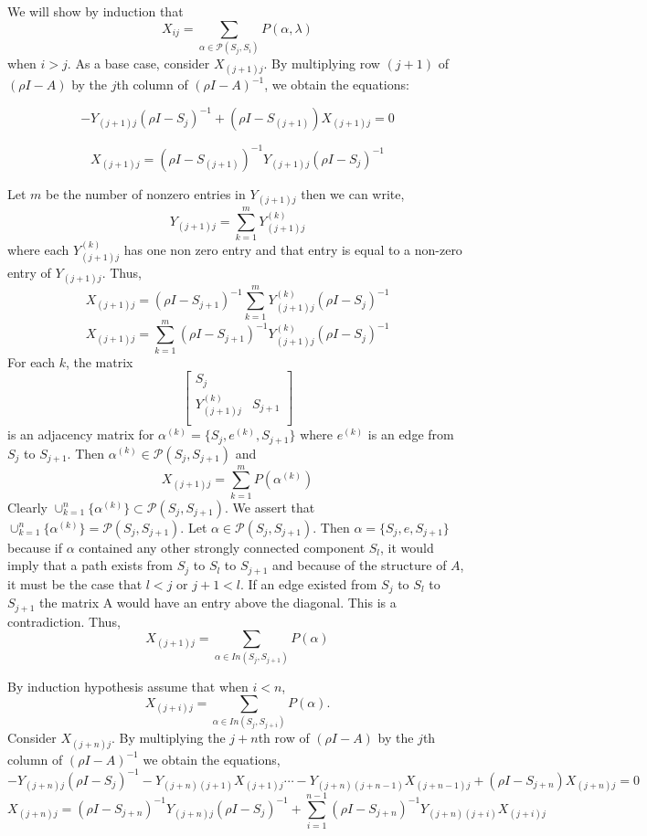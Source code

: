 \documentclass{paper}
\begin{document}
We will show by induction that 
\[
X_{ij} = \sum_{\alpha \in \mathcal{P}(S_j,S_i)} P(\alpha,\lambda)
\]
when $i > j$. As a base case, consider $X_{(j+1)j}$. By multiplying row $(j+1)$ of $(\rho I-A)$ by the $j$th column of $(\rho I - A)^{-1}$, we obtain the equations:

\[
-Y_{(j+1)j}(\rho I - S_{j})^{-1} + (\rho I -S_{(j+1)})X_{(j+1)j} = 0
\]

\begin{equation}
X_{(j+1)j} = (\rho I - S_{(j+1)})^{-1}Y_{(j+1)j}(\rho I - S_j)^{-1}
\end{equation}

Let $m$ be the number of nonzero entries in $Y_{(j+1)j}$ then we can write, 
\[Y_{(j+1)j} = \sum_{k=1}^{m} Y_{(j+1)j}^{(k)}\] 
where each $Y_{(j+1)j}^{(k)}$ has one non zero entry and that entry is equal to a non-zero entry of $Y_{(j+1)j}$. Thus, 
\[
X_{(j+1)j} = (\rho I - S_{j+1})^{-1} \sum_{k=1}^{m} Y_{(j+1)j}^{(k)}(\rho I - S_j)^{-1}
\]
\[
X_{(j+1)j} = \sum_{k=1}^{m}(\rho I - S_{j+1})^{-1}  Y_{(j+1)j}^{(k)}(\rho I - S_j)^{-1}
\]
For each $k$, the matrix
\[
\begin{bmatrix}
S_j \\
Y_{(j+1)j}^{(k)} & S_{j+1}\\
\end{bmatrix}
\]
is an adjacency matrix for $\alpha^{(k)}=\{S_{j},e^{(k)},S_{j+1}\}$
where $e^{(k)}$ is an edge from $S_j$ to $S_{j+1}$. Then $\alpha^{(k)} \in \mathcal{P}(S_j,S_{j+1})$ and 
\[
X_{(j+1)j} = \sum_{k=1}^{m}P(\alpha^{(k)})
\] 
Clearly $\cup_{k=1}^n\{\alpha^{(k)}\} \subset \mathcal{P}(S_j,S_{j+1})$. We assert that $\cup_{k=1}^n\{\alpha^{(k)}\} = \mathcal{P}(S_j,S_{j+1})$. Let $\alpha \in \mathcal{P}(S_j,S_{j+1})$. Then $\alpha = \{S_j,e,S_{j+1} \}$ because if $\alpha$ contained any other strongly connected component $S_l$, it would imply that a path exists from $S_j$ to $S_l$ to $S_{j+1}$ and because of the structure of $A$, it must be the case that $l < j$ or $j+1 < l$. If an edge existed from $S_j$ to $S_{l}$ to $S_{j+1}$ the matrix A would have an entry above the diagonal. This is a contradiction. Thus, 
\[
X_{(j+1)j} = \sum_{\alpha \in In(S_j,S_{j+1})}P(\alpha)
\]

By induction hypothesis assume that when $i < n$, \[
X_{(j+i)j} = \sum_{\alpha \in In(S_j,S_{j+i})}P(\alpha).
\]
Consider $X_{(j+n)j}$. By multiplying the $j+n$th row of $(\rho I - A)$ by the $j$th column of $(\rho I - A)^{-1}$ we obtain the equations,
\[
-Y_{(j+n)j}(\rho I - S_j)^{-1} -Y_{(j+n)(j+1)}X_{(j+1)j} \cdots -Y_{(j+n)(j+n-1)}X_{(j+n-1)j} + (\rho I - S_{j+n})X_{(j+n)j} = 0
\]
\begin{equation}
X_{(j+n)j} = (\rho I - S_{j+n})^{-1} Y_{(j+n)j}(\rho I - S_j)^{-1} + \sum_{i=1}^{n-1}(\rho I - S_{j+n})^{-1}Y_{(j+n)(j+i)}X_{(j+i)j} 
\end{equation}
\end{document}
